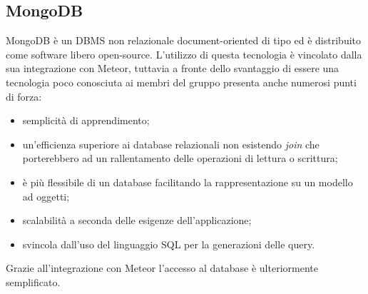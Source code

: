 \subsection{MongoDB}
MongoDB è un DBMS non relazionale document-oriented di tipo  ed è distribuito come software libero open-source. L'utilizzo di questa tecnologia è vincolato dalla sua integrazione con Meteor, tuttavia a fronte dello svantaggio di essere una tecnologia poco conosciuta ai membri del gruppo presenta anche numerosi punti di forza:
\begin{itemize}
	\item semplicità di apprendimento;
	\item un'efficienza superiore ai database relazionali non esistendo \textit{join} che porterebbero ad un rallentamento delle operazioni di lettura o scrittura; 
	\item è più flessibile di un database  facilitando la rappresentazione su un modello ad oggetti;
	\item scalabilità a seconda delle esigenze dell'applicazione;
	\item svincola dall'uso del linguaggio SQL per la generazioni delle query.
\end{itemize}
Grazie all'integrazione con Meteor l'accesso al database è ulteriormente semplificato.


